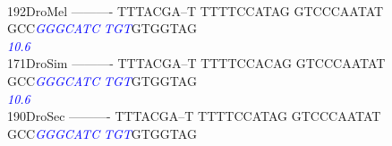 \documentclass[11pt,twoside,reqno,a4paper]{article}
\begin{document}
{\\
192\hspace*{1\charwidth}DroMel	----------	TTTACGA--T	TTTTCCATAG	GTCCCAATAT	GCC\textit{\textcolor{Blue}{G}}\textit{\textcolor{Blue}{G}}\textit{\textcolor{Blue}{G}}\textit{\textcolor{Blue}{C}}\textit{\textcolor{Blue}{A}}\textit{\textcolor{Blue}{T}}\textit{\textcolor{Blue}{C}}	\textit{\textcolor{Blue}{T}}\textit{\textcolor{Blue}{G}}\textit{\textcolor{Blue}{T}}GTGGTAG	\\
\hspace*{4\charwidth}\hspace*{7\charwidth}\hspace*{1\charwidth}\hspace*{1\charwidth}\hspace*{1\charwidth}\hspace*{1\charwidth}\hspace*{43\charwidth}\textit{\textcolor{Blue}{10.6}}\hspace*{1\charwidth}\hspace*{1\charwidth}\\
171\hspace*{1\charwidth}DroSim	----------	TTTACGA--T	TTTTCCACAG	GTCCCAATAT	GCC\textit{\textcolor{Blue}{G}}\textit{\textcolor{Blue}{G}}\textit{\textcolor{Blue}{G}}\textit{\textcolor{Blue}{C}}\textit{\textcolor{Blue}{A}}\textit{\textcolor{Blue}{T}}\textit{\textcolor{Blue}{C}}	\textit{\textcolor{Blue}{T}}\textit{\textcolor{Blue}{G}}\textit{\textcolor{Blue}{T}}GTGGTAG	\\
\hspace*{4\charwidth}\hspace*{7\charwidth}\hspace*{1\charwidth}\hspace*{1\charwidth}\hspace*{1\charwidth}\hspace*{1\charwidth}\hspace*{43\charwidth}\textit{\textcolor{Blue}{10.6}}\hspace*{1\charwidth}\hspace*{1\charwidth}\\
190\hspace*{1\charwidth}DroSec	----------	TTTACGA--T	TTTTCCATAG	GTCCCAATAT	GCC\textit{\textcolor{Blue}{G}}\textit{\textcolor{Blue}{G}}\textit{\textcolor{Blue}{G}}\textit{\textcolor{Blue}{C}}\textit{\textcolor{Blue}{A}}\textit{\textcolor{Blue}{T}}\textit{\textcolor{Blue}{C}}	\textit{\textcolor{Blue}{T}}\textit{\textcolor{Blue}{G}}\textit{\textcolor{Blue}{T}}GTGGTAG	\\
}
\end{document}
